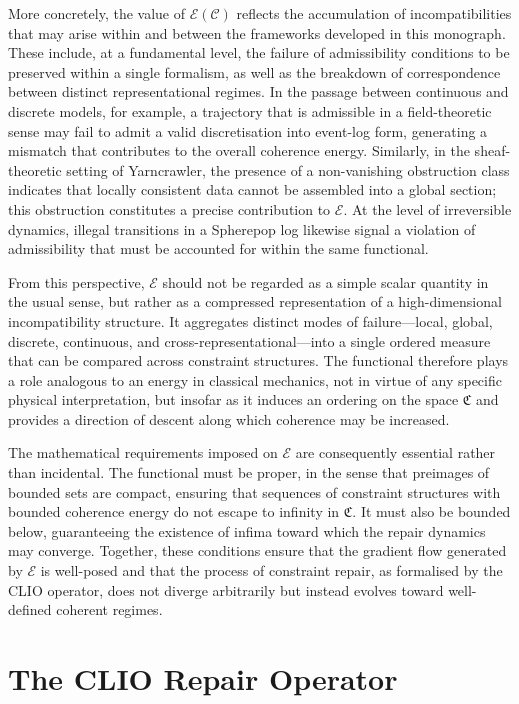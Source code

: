\documentclass[11pt,openany]{book}
\begin{document}
More concretely, the value of $\mathcal{E}(\mathcal{C})$
reflects the accumulation of incompatibilities that may
arise within and between the frameworks developed in this
monograph.  These include, at a fundamental level, the
failure of admissibility conditions to be preserved within
a single formalism, as well as the breakdown of
correspondence between distinct representational regimes.
In the passage between continuous and discrete models, for
example, a trajectory that is admissible in a field-theoretic
sense may fail to admit a valid discretisation into
event-log form, generating a mismatch that contributes to
the overall coherence energy.  Similarly, in the
sheaf-theoretic setting of Yarncrawler, the presence of a
non-vanishing obstruction class indicates that locally
consistent data cannot be assembled into a global section;
this obstruction constitutes a precise contribution to
$\mathcal{E}$.  At the level of irreversible dynamics,
illegal transitions in a Spherepop log likewise signal a
violation of admissibility that must be accounted for within
the same functional.

From this perspective, $\mathcal{E}$ should not be regarded
as a simple scalar quantity in the usual sense, but rather
as a compressed representation of a high-dimensional
incompatibility structure.  It aggregates distinct modes of
failure—local, global, discrete, continuous, and
cross-representational—into a single ordered measure that
can be compared across constraint structures.  The
functional therefore plays a role analogous to an energy in
classical mechanics, not in virtue of any specific physical
interpretation, but insofar as it induces an ordering on the
space $\mathfrak{C}$ and provides a direction of descent
along which coherence may be increased.

The mathematical requirements imposed on $\mathcal{E}$ are
consequently essential rather than incidental.  The
functional must be proper, in the sense that preimages of
bounded sets are compact, ensuring that sequences of
constraint structures with bounded coherence energy do not
escape to infinity in $\mathfrak{C}$.  It must also be
bounded below, guaranteeing the existence of infima toward
which the repair dynamics may converge.  Together, these
conditions ensure that the gradient flow generated by
$\mathcal{E}$ is well-posed and that the process of
constraint repair, as formalised by the CLIO operator, does
not diverge arbitrarily but instead evolves toward
well-defined coherent regimes.

\section{The CLIO Repair Operator}
\label{sec:clio-operator}
\end{document}

